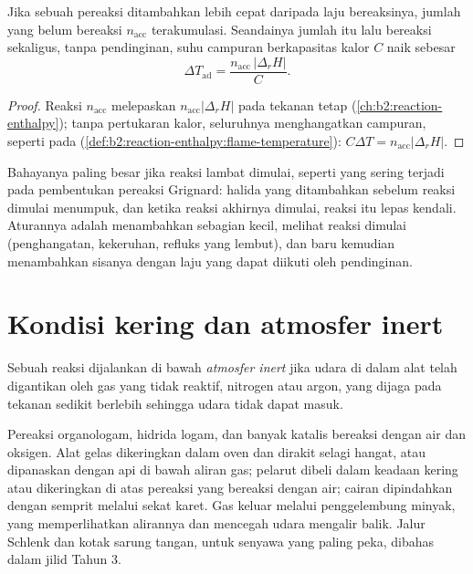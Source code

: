 \begin{proposition}[Akumulasi]\label{prop:b2:lab-techniques-2:accumulation}
Jika sebuah pereaksi ditambahkan lebih cepat daripada laju bereaksinya,
jumlah yang belum bereaksi $n_{\mathrm{acc}}$ terakumulasi. Seandainya
jumlah itu lalu bereaksi sekaligus, tanpa pendinginan, suhu campuran
berkapasitas kalor $C$ naik sebesar
\begin{equation*}
\Delta T_{\mathrm{ad}} = \frac{n_{\mathrm{acc}}\,|\Delta_rH|}{C}.
\end{equation*}
\end{proposition}

\begin{proof}
Reaksi $n_{\mathrm{acc}}$ melepaskan $n_{\mathrm{acc}}|\Delta_rH|$ pada
tekanan tetap (\cref{ch:b2:reaction-enthalpy}); tanpa pertukaran kalor,
seluruhnya menghangatkan campuran, seperti pada 
(\cref{def:b2:reaction-enthalpy:flame-temperature}): $C\Delta T =
n_{\mathrm{acc}}|\Delta_rH|$.
\end{proof}

Bahayanya paling besar jika reaksi lambat dimulai, seperti yang sering
terjadi pada pembentukan pereaksi Grignard: halida yang ditambahkan sebelum
reaksi dimulai menumpuk, dan ketika reaksi akhirnya dimulai, reaksi itu
lepas kendali. Aturannya adalah menambahkan sebagian kecil, melihat reaksi
dimulai (penghangatan, kekeruhan, refluks yang lembut), dan baru kemudian
menambahkan sisanya dengan laju yang dapat diikuti oleh pendinginan.

\section{Kondisi kering dan atmosfer inert}

\begin{definition}\label{def:b2:lab-techniques-2:inert}
Sebuah reaksi dijalankan di bawah \emph{atmosfer inert}
jika udara di dalam alat telah digantikan oleh gas yang tidak reaktif,
nitrogen atau argon, yang dijaga pada tekanan sedikit berlebih sehingga
udara tidak dapat masuk.
\end{definition}

Pereaksi organologam, hidrida logam, dan banyak katalis bereaksi dengan air
dan oksigen. Alat gelas dikeringkan dalam oven dan dirakit selagi hangat,
atau dipanaskan dengan api di bawah aliran gas; pelarut dibeli dalam
keadaan kering atau dikeringkan di atas pereaksi yang bereaksi dengan air;
cairan dipindahkan dengan semprit melalui sekat karet. Gas keluar melalui
penggelembung minyak, yang memperlihatkan alirannya dan mencegah udara
mengalir balik. Jalur Schlenk dan kotak sarung tangan, untuk senyawa yang
paling peka, dibahas dalam jilid Tahun 3.

